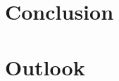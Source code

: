 \documentclass{article}
\begin{document}
\section{Conclusion}

\section{Outlook}

%
%
%
%
%
%
%
%
\end{document}

